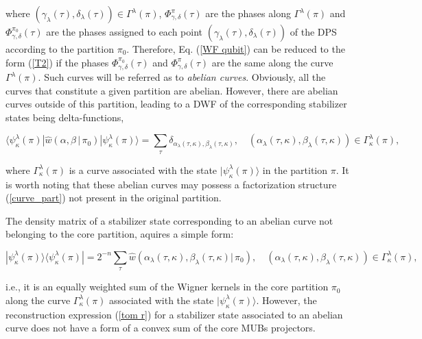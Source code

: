 \documentclass[quantumrep,article,submit,pdftex,moreauthors]{Definitions/mdpi}
\begin{document}
where $\left(\gamma_{\lambda}(\tau),\delta_{\lambda}(\tau)\right) \in
\Gamma^{\lambda}(\pi)$, $\Phi_{\gamma,\delta }^{\pi}(\tau)$ are the phases
along $\Gamma^{\lambda}(\pi)$ and $\Phi_{\gamma,\delta}^{\pi_{0}}(\tau)$ are the
phases assigned to each point $\left(
\gamma_{\lambda}(\tau),\delta_{\lambda}(\tau)\right)$ of the DPS according to
the partition $\pi_{0}$. Therefore, Eq. (\ref{WF qubit}) can be reduced to the
form (\ref{T2}) if the phases $\Phi_{\gamma,\delta }^{\pi_{0}}(\tau )$ and
$\Phi_{\gamma,\delta}^{\pi}(\tau )$ are the same along the curve
$\Gamma^{\lambda}(\pi)$. Such curves will be referred as to \textit{abelian
curves}. Obviously, all the curves that constitute a given partition are
abelian. However, there are abelian curves outside of this partition, leading to
a DWF of the corresponding stabilizer states being delta-functions,

\begin{equation}
  \langle \psi_{\kappa }^{\lambda}
  (\pi)|\hat{w} \left(\alpha,\beta \,|\,\pi_{0}\right)
  |\psi_{\kappa }^{\lambda}(\pi)\rangle
  = \sum_{\tau }
  \delta_{\alpha_{\lambda}(\tau,\kappa),\beta_{\lambda}(\tau,\kappa)},
  \quad \left(
    \alpha_{\lambda}(\tau,\kappa), \beta_{\lambda}(\tau,\kappa)
  \right) \in \Gamma_{\kappa }^{\lambda }(\pi),
\end{equation}

where $\Gamma_{\kappa }^{\lambda}(\pi)$ is a curve associated with the state
$|\psi_{\kappa }^{\lambda }(\pi)\rangle$ in the partition $\pi$. It is worth
noting that these abelian curves may possess a factorization structure
(\ref{curve_part}) not present in the original partition. 

The density matrix of a stabilizer state corresponding to an abelian curve not
belonging to the core partition, aquires a simple form:

\begin{equation}
  |\psi_{\kappa }^{\lambda}(\pi)\rangle
  \langle \psi_{\kappa }^{\lambda }(\pi)|
  = 2^{-n} \sum_{\tau}
  \hat{w}(\alpha_{\lambda}(\tau,\kappa),\beta_{\lambda}(\tau,\kappa)|\,\pi_{0}),
  \quad \left(
    \alpha_{\lambda }(\tau,\kappa),\beta_{\lambda}(\tau,\kappa)
  \right)
  \in \Gamma_{\kappa}^{\lambda}(\pi),
\end{equation}

i.e., it is an equally weighted sum of the Wigner kernels in the core partition
$\pi_{0}$ along the curve $\Gamma_{\kappa }^{\lambda}(\pi)$ associated with the
state $|\psi_{\kappa}^{\lambda }(\pi)\rangle$. However, the reconstruction
expression (\ref{tom r}) for a stabilizer state associated to an abelian curve
does not have a form of a convex sum of the core MUBs projectors.
\end{document}
